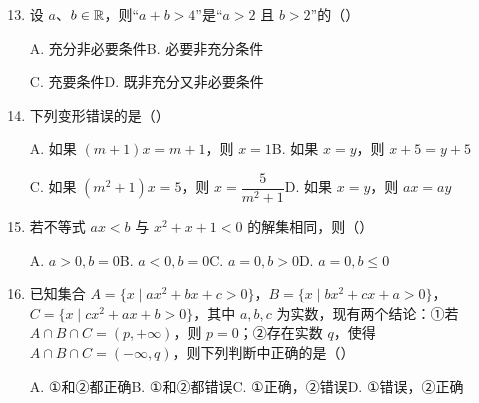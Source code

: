 \documentclass[a4paper,11pt]{article}
\begin{document}

\begin{enumerate}
\setcounter{enumi}{12}

\item 设 $a$、$b\in\mathbb{R}$，则“$a+b>4$”是“$a>2$ 且 $b>2$”的\mbox{（\quad）}

\keepwithprev
A. 充分非必要条件\qquad B. 必要非充分条件

C. 充要条件\qquad D. 既非充分又非必要条件

\ifanswer
\solbegin
{}
\solend
\fi

\item 下列变形错误的是\mbox{（\quad）}

\keepwithprev
A. 如果 $(m+1)x=m+1$，则 $x=1$\qquad B. 如果 $x=y$，则 $x+5=y+5$

C. 如果 $(m^2+1)x=5$，则 $x=\dfrac5{m^2+1}$\qquad D. 如果 $x=y$，则 $ax=ay$

\ifanswer
\solbegin
{}
\solend
\fi

\item 若不等式 $ax<b$ 与 $x^2+x+1<0$ 的解集相同，则\mbox{（\quad）}

\keepwithprev
A. $a>0,b=0$\qquad B. $a<0,b=0$\qquad C. $a=0,b>0$\qquad D. $a=0,b\leqslant0$

\ifanswer
\solbegin
{}
\solend
\fi

\item 已知集合 $A=\{x\mid ax^2+bx+c>0\}$，$B=\{x\mid bx^2+cx+a>0\}$，$C=\{x\mid cx^2+ax+b>0\}$，其中 $a,b,c$ 为实数，现有两个结论：①若 $A\cap B\cap C=(p,+\infty)$，则 $p=0$；②存在实数 $q$，使得 $A\cap B\cap C=(-\infty,q)$，则下列判断中正确的是\mbox{（\quad）}

\keepwithprev
A. ①和②都正确\qquad B. ①和②都错误\qquad C. ①正确，②错误\qquad D. ①错误，②正确


\end{enumerate}
\end{document}
